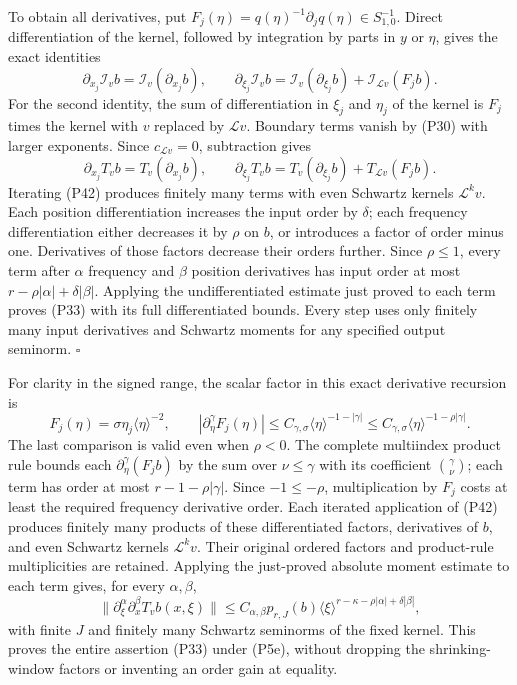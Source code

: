 \documentclass[
  11pt,
]{article}
\begin{document}
To obtain all derivatives, put
\(F_j(\eta)=q(\eta)^{-1}\partial_jq(\eta)\in S^{-1}_{1,0}\). Direct
differentiation of the kernel, followed by integration by parts in \(y\)
or \(\eta\), gives the exact identities \[
 \partial_{x_j}\mathcal I_v b=\mathcal I_v(\partial_{x_j}b),
 \qquad
 \partial_{\xi_j}\mathcal I_v b
 =\mathcal I_v(\partial_{\xi_j}b)+\mathcal I_{\mathcal L v}(F_jb).
\tag{P41}
\] For the second identity, the sum of differentiation in \(\xi_j\) and
\(\eta_j\) of the kernel is \(F_j\) times the kernel with \(v\) replaced
by \(\mathcal L v\). Boundary terms vanish by (P30) with larger
exponents. Since \(c_{\mathcal L v}=0\), subtraction gives \[
 \partial_{x_j}T_vb=T_v(\partial_{x_j}b),
 \qquad
 \partial_{\xi_j}T_vb=T_v(\partial_{\xi_j}b)+T_{\mathcal L v}(F_jb).
\tag{P42}
\] Iterating (P42) produces finitely many terms with even Schwartz
kernels \(\mathcal L^kv\). Each position differentiation increases the
input order by \(\delta\); each frequency differentiation either
decreases it by \(\rho\) on \(b\), or introduces a factor of order minus
one. Derivatives of those factors decrease their orders further. Since
\(\rho\leq1\), every term after \(\alpha\) frequency and \(\beta\)
position derivatives has input order at most
\(r-\rho|\alpha|+\delta|\beta|\). Applying the undifferentiated estimate
just proved to each term proves (P33) with its full differentiated
bounds. Every step uses only finitely many input derivatives and
Schwartz moments for any specified output seminorm. \(\square\)

For clarity in the signed range, the scalar factor in this exact
derivative recursion is \[
 F_j(\eta)=\sigma\eta_j\langle\eta\rangle^{-2},\qquad
 |\partial_\eta^\gamma F_j(\eta)|
 \leq C_{\gamma,\sigma}\langle\eta\rangle^{-1-|\gamma|}
 \leq C_{\gamma,\sigma}\langle\eta\rangle^{-1-\rho|\gamma|}.
 \tag{P42e}
\] The last comparison is valid even when \(\rho<0\). The complete
multiindex product rule bounds each \(\partial_\eta^\gamma(F_jb)\) by
the sum over \(\nu\leq\gamma\) with its coefficient
\({\gamma\choose\nu}\); each term has order at most
\(r-1-\rho|\gamma|\). Since \(-1\leq-\rho\), multiplication by \(F_j\)
costs at least the required frequency derivative order. Each iterated
application of (P42) produces finitely many products of these
differentiated factors, derivatives of \(b\), and even Schwartz kernels
\(\mathcal L^kv\). Their original ordered factors and product-rule
multiplicities are retained. Applying the just-proved absolute moment
estimate to each term gives, for every \(\alpha,\beta\), \[
 \|\partial_\xi^\alpha\partial_x^\beta T_vb(x,\xi)\|
 \leq C_{\alpha,\beta}p_{r,J}(b)
       \langle\xi\rangle^{r-\kappa-\rho|\alpha|+\delta|\beta|},
 \tag{P42f}
\] with finite \(J\) and finitely many Schwartz seminorms of the fixed
kernel. This proves the entire assertion (P33) under (P5e), without
dropping the shrinking-window factors or inventing an order gain at
equality.
\end{document}
